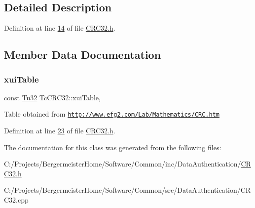 \subsection{Detailed Description}


Definition at line \mbox{\hyperlink{_c_r_c32_8h_source_l00014}{14}} of file \mbox{\hyperlink{_c_r_c32_8h_source}{C\+R\+C32.\+h}}.



\subsection{Member Data Documentation}
\mbox{\label{class_g_n_common_1_1_n_data_authentication_1_1_tc_c_r_c32_a2c841dc8051fc7e1719224929f24b32d}} 
\subsubsection{\texorpdfstring{xui\+Table}{xuiTable}}
{\footnotesize\ttfamily const \mbox{\hyperlink{namespace_g_n_common_a941b527ef318f318aed7903dc832b7e4}{Tu32}} Tc\+C\+R\+C32\+::xui\+Table\hspace{0.3cm}{\ttfamily [static]}, {\ttfamily [protected]}}

Table obtained from \href{http://www.efg2.com/Lab/Mathematics/CRC.htm}{\tt http\+://www.\+efg2.\+com/\+Lab/\+Mathematics/\+C\+R\+C.\+htm} 

Definition at line \mbox{\hyperlink{_c_r_c32_8h_source_l00023}{23}} of file \mbox{\hyperlink{_c_r_c32_8h_source}{C\+R\+C32.\+h}}.



The documentation for this class was generated from the following files\+:\begin{DoxyCompactItemize}
\item 
C\+:/\+Projects/\+Bergermeister\+Home/\+Software/\+Common/inc/\+Data\+Authentication/\mbox{\hyperlink{_c_r_c32_8h}{C\+R\+C32.\+h}}\item 
C\+:/\+Projects/\+Bergermeister\+Home/\+Software/\+Common/src/\+Data\+Authentication/C\+R\+C32.\+cpp\end{DoxyCompactItemize}
